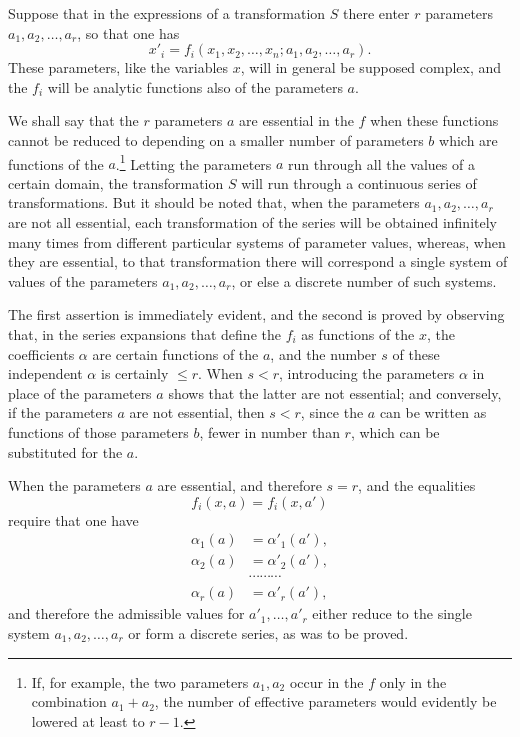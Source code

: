 \documentclass[11pt]{book}
\begin{document}
Suppose that in the expressions of a transformation $S$ there enter $r$ parameters $a_1,a_2,\ldots,a_r$, so that one has
\begin{equation*}\tag{3}
 x'_i=f_i(x_1,x_2,\ldots,x_n; a_1,a_2,\ldots,a_r).
\end{equation*}
These parameters, like the variables $x$, will in general be supposed complex, and the $f_i$ will be analytic functions also of the parameters $a$.

We shall say that the $r$ parameters $a$ are essential in the $f$ when these functions cannot be reduced to depending on a smaller number of parameters $b$ which are functions of the $a$.\footnote{If, for example, the two parameters $a_1,a_2$ occur in the $f$ only in the combination $a_1+a_2$, the number of effective parameters would evidently be lowered at least to $r-1$.}
Letting the parameters $a$ run through all the values of a certain domain, the transformation $S$ will run through a continuous series of transformations. But it should be noted that, when the parameters $a_1,a_2,\ldots,a_r$ are not all essential, each transformation of the series will be obtained infinitely many times from different particular systems of parameter values, whereas, when they are essential, to that transformation there will correspond a single system of values of the parameters $a_1,a_2,\ldots,a_r$, or else a discrete number of such systems.

The first assertion is immediately evident, and the second is proved by observing that, in the series expansions that define the $f_i$ as functions of the $x$, the coefficients $\alpha$ are certain functions of the $a$, and the number $s$ of these independent $\alpha$ is certainly $\leq r$. When $s<r$, introducing the parameters $\alpha$ in place of the parameters $a$ shows that the latter are not essential; and conversely, if the parameters $a$ are not essential, then $s<r$, since the $a$ can be written as functions of those parameters $b$, fewer in number than $r$, which can be substituted for the $a$.

When the parameters $a$ are essential, and therefore $s=r$, and the equalities
\[
 f_i(x,a)=f_i(x,a')
\]
require that one have
\[
\begin{aligned}
 \alpha_1(a)&=\alpha'_1(a'),\\
 \alpha_2(a)&=\alpha'_2(a'),\\
 &\cdots\cdots\cdots\\
 \alpha_r(a)&=\alpha'_r(a'),
\end{aligned}
\]
and therefore the admissible values for $a'_1,\ldots,a'_r$ either reduce to the single system $a_1,a_2,\ldots,a_r$ or form a discrete series, as was to be proved.
\end{document}
